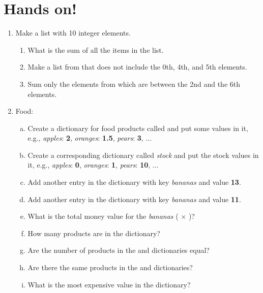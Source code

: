 \documentclass[aspectratio=1610,slidestop]{beamer}
\begin{document}
\section{Hands on!}
\begin{pframe}
 \vspace{-0.5cm}
 \begin{enumerate}
  \item Make a list  with 10 integer elements.
  \begin{enumerate}[a]
  \item What is the sum of all the items in the  list.
  \item Make a list  from  that does not include the 0th, 4th, and 5th elements.
  \item Sum only the elements from  which are between the 2nd and the 6th elements.
  \end{enumerate}
  \item Food:
  \begin{enumerate}[a.]
   \item Create a dictionary for food products called  and put some
       values in it, e.g., \textit{apples}: \textbf{2}, \textit{oranges}: \textbf{1.5},
          \textit{pears}: \textbf{3}, ...
      \item Create a corresponding dictionary called \textit{stock} and put the stock
          values in it, e.g., \textit{apples}: \textbf{0}, \textit{oranges}:
          \textbf{1}, \textit{pears}: \textbf{10}, ...
   \item Add another entry in the  dictionary with key \textit{bananas} and value \textbf{13}.
   \item Add another entry in the  dictionary with key \textit{bananas} and value \textbf{11}.
   \item What is the total money value for the \textit{bananas} ( $\times$ )?
   \item How many products are in the  dictionary?\\
   \item Are the number of products in the  and  dictionaries equal?
   \item Are there the same products in the  and  dictionaries?
   \item What is the most expensive value in the  dictionary?
  \end{enumerate}
 \end{enumerate}
\end{pframe}


\end{document}

